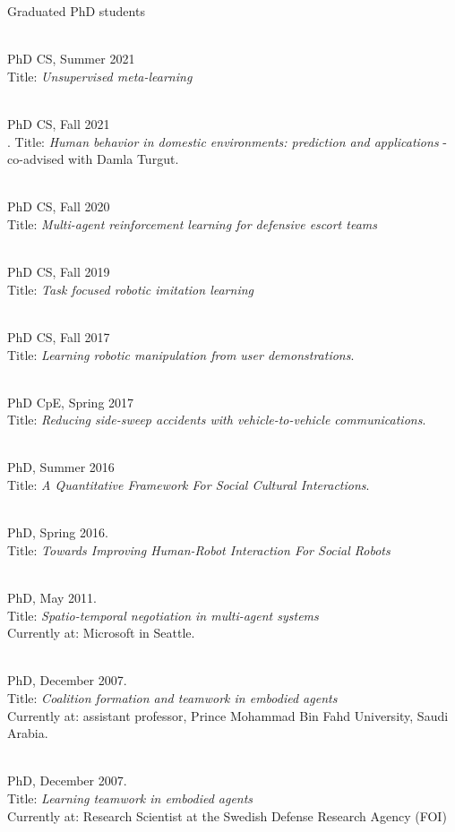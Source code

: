 \begin{category}{Graduated PhD students}

 \\
  PhD CS, Summer 2021 \\ %
  Title: {\em Unsupervised meta-learning}
  
 \\
  PhD CS, Fall 2021 \\.
  Title: {\em Human behavior in domestic environments: prediction and applications} - co-advised with Damla Turgut.
  
 \\
  PhD CS, Fall 2020 \\ %
  Title: {\em Multi-agent reinforcement learning for defensive escort teams}

 \\
  PhD CS,  Fall 2019 \\  %
  Title: {\em Task focused robotic imitation learning}

 \\
  PhD CS, Fall 2017 \\
  Title: {\em Learning robotic manipulation from user demonstrations}.

 \\
PhD CpE, Spring 2017 \\
Title: {\em Reducing side-sweep accidents with vehicle-to-vehicle communications}.

 \\
PhD, Summer 2016 \\
Title: {\em A Quantitative Framework For Social Cultural Interactions}.

 \\
PhD, Spring 2016. \\ %
Title: {\em Towards Improving Human-Robot Interaction For Social Robots}

 \\
PhD, May 2011. \\
Title: {\em Spatio-temporal negotiation in multi-agent systems} \\
Currently at: Microsoft in Seattle.

 \\
PhD, December 2007. \\
Title: {\em Coalition formation and teamwork in embodied agents} \\
Currently at: assistant professor, Prince Mohammad Bin Fahd University, Saudi Arabia.

 \\
PhD, December 2007. \\
Title: {\em Learning teamwork in embodied agents} \\
Currently at: Research Scientist at the Swedish Defense Research Agency (FOI)

\end{category}


